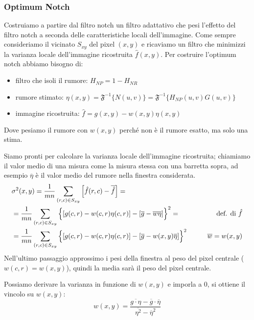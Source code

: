 \subsubsection{Optimum Notch}
Costruiamo a partire dal filtro notch un filtro adattativo che pesi l'effetto del filtro notch a seconda delle caratteristiche locali dell'immagine. Come sempre consideriamo il vicinato $S_{xy}$ del pixel $(x,y)$ e ricaviamo un filtro che minimizzi la varianza locale dell'immagine ricostruita $\hat{f}(x,y)$. Per costruire l'optimum notch abbiamo bisogno di:
\begin{itemize}
	\item filtro che isoli il rumore: $H_{NP} = 1 - H_{NR}$
	\item rumore stimato: $\eta(x,y)= \mathfrak{F}^{-1}\{N(u,v)\}= \mathfrak{F}^{-1}\{H_{NP}(u,v)G(u,v)\}$
	\item immagine ricostruita: $\hat{f} = g(x,y) - w(x,y)\eta(x,y)$
\end{itemize}
Dove pesiamo il rumore con $w(x,y)$ perché non è il rumore esatto, ma solo una stima.

Siamo pronti per calcolare la varianza locale dell'immagine ricostruita; chiamiamo il valor medio di una misura come la misura stessa con una barretta sopra, ad esempio $\overline{\eta}$ è il valor medio del rumore nella finestra considerata.
\begin{align}
	&\sigma^2(x,y) = \frac{1}{mn} \sum_{(r,c)\in S_{xy}}\Big[\hat{f}(r,c) - \overline{\hat{f}}\Big] =	& \\
	&= \frac{1}{mn} \sum_{(r,c)\in S_{xy}} \Big\{ [g(c,r) -w(c,r)\eta(c,r)] - [\overline{g} -\overline{w\eta}]\Big\}^2 = & \text{def. di } \hat{f}  \notag \\
	&= \frac{1}{mn} \sum_{(r,c)\in S_{xy}} \Big\{ [g(c,r) -w(c,r)\eta(c,r)] - [\overline{g} - w(x,y)\overline{\eta}]\Big\}^2 & \qquad\overline{w}= w(x,y)  \notag
\end{align}
Nell'ultimo passaggio approssimo i pesi della finestra al peso del pixel centrale ($w(c,r) = w(x,y)$), quindi la media sarà il peso del pixel centrale. 

Possiamo derivare la varianza in funzione di $w(x,y)$ e imporla a $0$, si ottiene il vincolo su $w(x,y)$:
\begin{equation}
	w(x,y) = \frac{\overline{g\cdot\eta} - \overline{g}\cdot\overline{\eta}}{\overline{\eta^2} - \overline{\eta}^2}
\end{equation}


